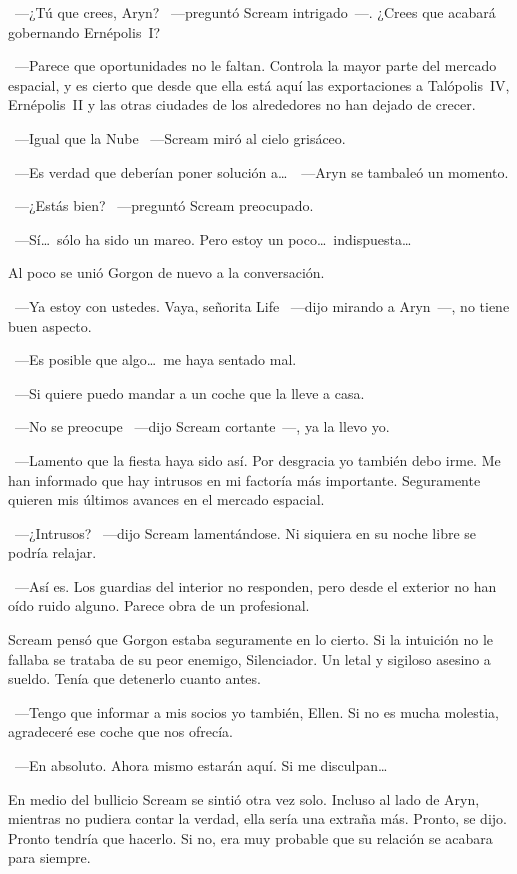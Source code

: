 ~---¿Tú que crees, Aryn? ~---preguntó Scream intrigado~---. ¿Crees que acabará gobernando Ernépolis~I?

~---Parece que oportunidades no le faltan. Controla la mayor parte del mercado espacial, y es cierto que desde que ella está aquí las exportaciones a Talópolis~IV, Ernépolis~II y las otras ciudades de los alrededores no han dejado de crecer.

~---Igual que la Nube ~---Scream miró al cielo grisáceo.

~---Es verdad que deberían poner solución a\dots\ ~---Aryn se tambaleó un momento.

~---¿Estás bien? ~---preguntó Scream preocupado.

~---Sí\dots\ sólo ha sido un mareo. Pero estoy un poco\dots\ indispuesta\dots

Al poco se unió Gorgon de nuevo a la conversación.

~---Ya estoy con ustedes. Vaya, señorita Life ~---dijo mirando a Aryn~---, no tiene buen aspecto.

~---Es posible que algo\dots\ me haya sentado mal.

~---Si quiere puedo mandar a un coche que la lleve a casa.

~---No se preocupe ~---dijo Scream cortante~---, ya la llevo yo.

~---Lamento que la fiesta haya sido así. Por desgracia yo también debo irme. Me han informado que hay intrusos en mi factoría más importante. Seguramente quieren mis últimos avances en el mercado espacial.

~---¿Intrusos? ~---dijo Scream lamentándose. Ni siquiera en su noche libre se podría relajar.

~---Así es. Los guardias del interior no responden, pero desde el exterior no han oído ruido alguno. Parece obra de un profesional.

Scream pensó que Gorgon estaba seguramente en lo cierto. Si la intuición no le fallaba se trataba de su peor enemigo, Silenciador. Un letal y sigiloso asesino a sueldo. Tenía que detenerlo cuanto antes.

~---Tengo que informar a mis socios yo también, Ellen. Si no es mucha molestia, agradeceré ese coche que nos ofrecía.

~---En absoluto. Ahora mismo estarán aquí. Si me disculpan\dots

En medio del bullicio Scream se sintió otra vez solo. Incluso al lado de Aryn, mientras no pudiera contar la verdad, ella sería una extraña más. Pronto, se dijo. Pronto tendría que hacerlo. Si no, era muy probable que su relación se acabara para siempre.

